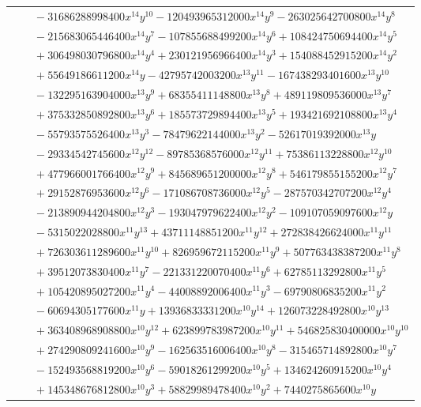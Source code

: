\documentclass[11pt]{article}
\begin{document}
\begin{longtable}{@{}ll@{}}
 & $\quad -31686288998400x^{14}y^{10}-120493965312000x^{14}y^{9}-263025642700800x^{14}y^{8}$\\
 & $\quad -215683065446400x^{14}y^{7}-107855688499200x^{14}y^{6}+108424750694400x^{14}y^{5}$\\
 & $\quad +306498030796800x^{14}y^{4}+230121956966400x^{14}y^{3}+154088452915200x^{14}y^{2}$\\
 & $\quad +55649186611200x^{14}y-42795742003200x^{13}y^{11}-167438293401600x^{13}y^{10}$\\
 & $\quad -132295163904000x^{13}y^{9}+68355411148800x^{13}y^{8}+489119809536000x^{13}y^{7}$\\
 & $\quad +375332850892800x^{13}y^{6}+185573729894400x^{13}y^{5}+193421692108800x^{13}y^{4}$\\
 & $\quad -55793575526400x^{13}y^{3}-78479622144000x^{13}y^{2}-52617019392000x^{13}y$\\
 & $\quad -29334542745600x^{12}y^{12}-89785368576000x^{12}y^{11}+75386113228800x^{12}y^{10}$\\
 & $\quad +477966001766400x^{12}y^{9}+845689651200000x^{12}y^{8}+546179855155200x^{12}y^{7}$\\
 & $\quad +29152876953600x^{12}y^{6}-171086708736000x^{12}y^{5}-287570342707200x^{12}y^{4}$\\
 & $\quad -213890944204800x^{12}y^{3}-193047979622400x^{12}y^{2}-109107059097600x^{12}y$\\
 & $\quad -5315022028800x^{11}y^{13}+43711148851200x^{11}y^{12}+272838426624000x^{11}y^{11}$\\
 & $\quad +726303611289600x^{11}y^{10}+826959672115200x^{11}y^{9}+507763438387200x^{11}y^{8}$\\
 & $\quad +39512073830400x^{11}y^{7}-221331220070400x^{11}y^{6}+62785113292800x^{11}y^{5}$\\
 & $\quad +105420895027200x^{11}y^{4}-44008892006400x^{11}y^{3}-69790806835200x^{11}y^{2}$\\
 & $\quad -60694305177600x^{11}y+13936833331200x^{10}y^{14}+126073228492800x^{10}y^{13}$\\
 & $\quad +363408968908800x^{10}y^{12}+623899783987200x^{10}y^{11}+546825830400000x^{10}y^{10}$\\
 & $\quad +274290809241600x^{10}y^{9}-162563516006400x^{10}y^{8}-315465714892800x^{10}y^{7}$\\
 & $\quad -152493568819200x^{10}y^{6}-59018261299200x^{10}y^{5}+134624260915200x^{10}y^{4}$\\
 & $\quad +145348676812800x^{10}y^{3}+58829989478400x^{10}y^{2}+7440275865600x^{10}y$\\

\end{longtable}
\end{document}
